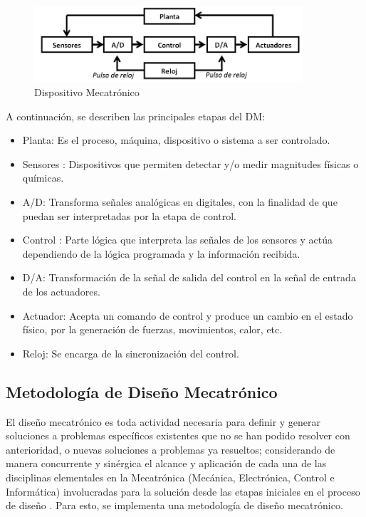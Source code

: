 \begin{figure}[H]
	\centering
	\includegraphics[width=10cm]{imagenes/DM}
	\caption{Dispositivo Mecatrónico}
	\label{fig:DM}
\end{figure}

A continuación, se describen las principales etapas del DM:
\begin{itemize}
	\item Planta: Es el proceso, máquina, dispositivo o sistema a ser controlado. 
	\item Sensores : Dispositivos que permiten detectar y/o medir magnitudes físicas o químicas. 
	\item A/D: Transforma señales analógicas en digitales, con la finalidad de que puedan ser interpretadas por la etapa de control. 
	\item Control : Parte lógica que interpreta las señales de los sensores y actúa dependiendo de la lógica programada y la información recibida. 
	\item D/A: Transformación de la señal de salida del control en la señal de entrada de los actuadores. 
	\item Actuador: Acepta un comando de control y produce un cambio en el estado físico, por la generación de fuerzas, movimientos, calor, etc. 
	\item Reloj: Se encarga de la sincronización del control. 
\end{itemize}

\subsection{Metodología de Diseño Mecatrónico}
El diseño mecatrónico es toda actividad necesaria para definir y generar soluciones a problemas específicos existentes que no se han podido resolver con anterioridad, o nuevas soluciones a problemas ya resueltos; considerando de manera concurrente y sinérgica el alcance y aplicación de cada una de las disciplinas elementales en la Mecatrónica (Mecánica, Electrónica, Control e Informática) involucradas para la solución desde las etapas iniciales en el proceso de diseño \cite{I6:2019:Online}. Para esto, se implementa una metodología de diseño mecatrónico. \\

